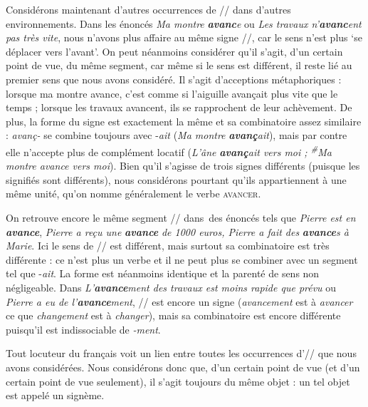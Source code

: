 Considérons maintenant d’autres occurrences de // dans d’autres environnements.
Dans les énoncés \textit{Ma montre} \textbf{\textit{avanc}}\textit{e} ou \textit{Les travaux n’}\textbf{\textit{avanc}}\textit{ent pas très vite}, nous n’avons plus affaire au même signe //, car le sens n’est plus ‘se déplacer vers l’avant’. On peut néanmoins considérer qu’il s’agit, d’un certain point de vue, du même segment, car même si le sens est différent, il reste lié au premier sens que nous avons considéré. Il s’agit d’acceptions métaphoriques : lorsque ma montre avance, c’est comme si l’aiguille avançait plus vite que le temps ; lorsque les travaux avancent, ils se rapprochent de leur achèvement. De plus, la forme du signe est exactement la même et sa combinatoire assez similaire : \textit{avanç-} se combine toujours avec -\textit{ait} (\textit{Ma montre} \textbf{\textit{avanç}}\textit{ait}), mais par contre elle n’accepte plus de complément locatif (\textit{L’âne} \textbf{\textit{avanç}}\textit{ait vers moi ; \textsuperscript{\#}}\textit{Ma montre avance vers moi}). Bien qu’il s’agisse de trois signes différents (puisque les signifiés sont différents), nous considérons pourtant qu’ils appartiennent à une même unité, qu’on nomme généralement le verbe \textsc{avancer}.

On retrouve encore le même segment // dans~des énoncés tels que \textit{Pierre est en} \textbf{\textit{avance}}, \textit{Pierre a reçu une} \textbf{\textit{avance}} \textit{de 1000 euros, Pierre a fait des} \textbf{\textit{avance}}\textit{s à Marie}. Ici le sens de // est différent, mais surtout sa combinatoire est très différente : ce n’est plus un verbe et il ne peut plus se combiner avec un segment tel que -\textit{ait}. La forme est néanmoins identique et la parenté de sens non négligeable. Dans \textit{L’}\textbf{\textit{avance}}\textit{ment des travaux est moins rapide que prévu} ou \textit{Pierre a eu de l’}\textbf{\textit{avance}}\textit{ment}, // est encore un signe (\textit{avancement} est à \textit{avancer} ce que \textit{changement} est à \textit{changer}), mais sa combinatoire est encore différente puisqu’il est indissociable de \textit{{}-ment}.%

Tout locuteur du français voit un lien entre toutes les occurrences d’// que nous avons considérées. Nous considérons donc que, d’un certain point de vue (et d’un certain point de vue seulement), il s’agit toujours du même objet : un tel objet est appelé un signème.

